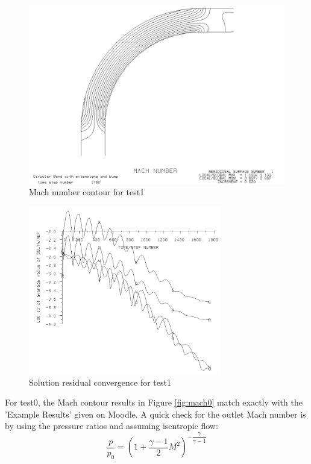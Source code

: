 \documentclass[12pt, a4paper]{article}
\begin{document}
\begin{figure}[H] %
	\centering
	\includegraphics[width=\textwidth]{1mach}
	\caption{Mach number contour for test1}
	\label{fig:mach1}
\end{figure}
\begin{figure}[H]
	\centering
	\includegraphics[width=0.75\textwidth]{1conv}
	\caption{Solution residual convergence for test1}
	\label{fig:conv1}
\end{figure}

For test0, the Mach contour results in Figure \ref{fig:mach0} match exactly with the 'Example Results' given on Moodle. A quick check for the outlet Mach number is by using the pressure ratios and assuming isentropic flow:
\begin{equation}\label{eq:mach}
	\dfrac{p}{p_0}=\left(1+\dfrac{\gamma-1}{2}M^2\right)^{-\dfrac{\gamma}{\gamma-1}}
\end{equation}
\end{document}
